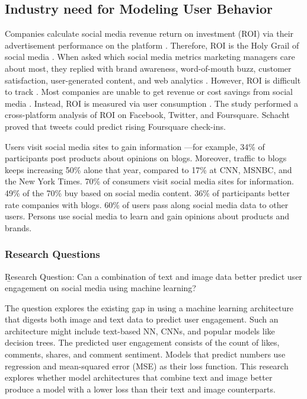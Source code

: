 \documentclass{article}
\begin{document}
\subsection{Industry need for Modeling User Behavior}

Companies calculate social media revenue return on investment (ROI) via their advertisement performance on the platform \cite{Fisher2009}. Therefore, ROI is the Holy Grail of social media \cite{Fisher2009}. When asked which social media metrics marketing managers care about most, they replied with brand awareness, word-of-mouth buzz, customer satisfaction, user-generated content, and web analytics \cite{Tiago2014}. However, ROI is difficult to track \cite{Schacht2015}. Most companies are unable to get revenue or cost savings from social media \cite{Romero2011}. Instead, ROI is measured via user consumption \cite{Schacht2015}. The study performed a cross-platform analysis of ROI on Facebook, Twitter, and Foursquare. Schacht proved that tweets could predict rising Foursquare check-ins.

Users visit social media sites to gain information \cite{Fisher2009}—for example, 34\% of participants post products about opinions on blogs. Moreover, traffic to blogs keeps increasing 50\% alone that year, compared to 17\% at CNN, MSNBC, and the New York Times. 70\% of consumers visit social media sites for information. 49\% of the 70\% buy based on social media content. 36\% of participants better rate companies with blogs. 60\% of users pass along social media data to other users. Persons use social media to learn and gain opinions about products and brands.

\subsubsection{Research Questions}
\b{Research Question:} Can a combination of text and image data better predict user engagement on social media using machine learning?


The question explores the existing gap in using a machine learning architecture that digests both image and text data to predict user engagement. Such an architecture might include text-based NN, CNNs, and popular models like decision trees. The predicted user engagement consists of the count of likes, comments, shares, and comment sentiment. Models that predict numbers use regression and mean-squared error (MSE) as their loss function. This research explores whether model architectures that combine text and image better produce a model with a lower loss than their text and image counterparts. 
\end{document}
